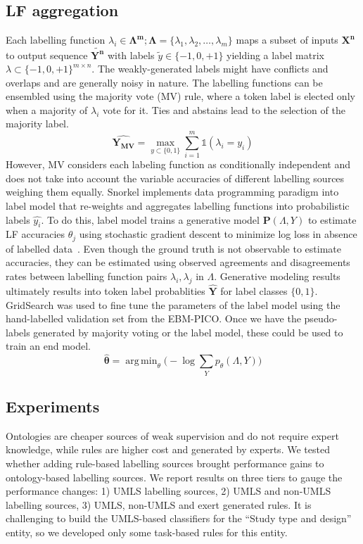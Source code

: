 \documentclass[10.7pt,]{article}
\DeclareMathOperator*{\argmin}{arg\,min}
\begin{document}
\subsection{LF aggregation}\label{lms}
%
Each labelling function $ \lambda_{i} \in \bm{\Lambda^{m}}; \bm{\Lambda} = \{\lambda_{1}, \lambda_{2}, \dotso, \lambda_{m} \} $ maps a subset of inputs $\bm{X^{n}}$ to output sequence $ \widetilde{\bm{Y^{n}}}$ with labels $\widetilde{y} \in \{-1, 0, +1\}$ yielding a label matrix $ \lambda \subset \{-1, 0, +1\}^{m \times n}$.
The weakly-generated labels might have conflicts and overlaps and are generally noisy in nature.
The labelling functions can be ensembled using the majority vote (MV) rule, where a token label is elected only when a majority of $\lambda_{i}$ vote for it.
Ties and abstains lead to the selection of the majority label.
%
\begin{equation}
\bm{\hat{Y_{MV}}} = \max_{{y \subset \{ 0, 1 \} }} \sum_{i=1}^{m} \mathds{1} (\lambda_{i} = y_{i})
\end{equation}
%
However, MV considers each labeling function as conditionally independent and does not take into account the variable accuracies of different labelling sources weighing them equally.
Snorkel implements data programming paradigm into label model that re-weights and aggregates labelling functions into probabilistic labels $\hat{y_{i}}$.
To do this, label model trains a generative model $ \bm{P} ( \Lambda , Y )$ to estimate LF accuracies $\theta_{j}$ using stochastic gradient descent to minimize log loss in absence of labelled data~\cite{ratner2017snorkel,dunnmon2020cross}.
Even though the ground truth is not observable to estimate accuracies, they can be estimated using observed agreements and disagreements rates between labelling function pairs $ \lambda_{i}, \lambda_{j}$ in $\Lambda$.
Generative modeling results ultimately results into token label probablities $\bm{\hat{Y}}$ for label classes $ \{ 0, 1\} $.
GridSearch was used to fine tune the parameters of the label model using the hand-labelled validation set from the EBM-PICO.
Once we have the pseudo-labels generated by majority voting or the label model, these could be used to train an end model.
%
\begin{equation}
\bm{\hat{\theta}} = \argmin_{\theta} \big( -\log \sum_{Y} p_{\theta} (\Lambda , Y ) \big)
\end{equation}
%
%
%
\subsection{Experiments}\label{transformers}
%
Ontologies are cheaper sources of weak supervision and do not require expert knowledge, while rules are higher cost and generated by experts.
We tested whether adding rule-based labelling sources brought performance gains to ontology-based labelling sources.
We report results on three tiers to gauge the performance changes: 1) UMLS labelling sources, 2) UMLS and non-UMLS labelling sources, 3) UMLS, non-UMLS and exert generated rules. 
It is challenging to build the UMLS-based classifiers for the ``Study type and design'' entity, so we developed only some task-based rules for this entity.
\end{document}
